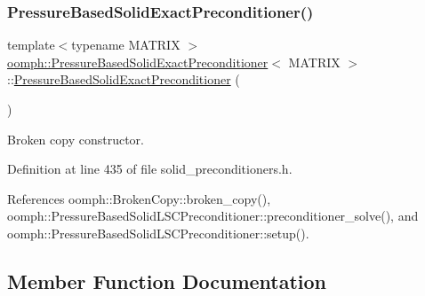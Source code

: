 \subsubsection{\texorpdfstring{Pressure\+Based\+Solid\+Exact\+Preconditioner()}{PressureBasedSolidExactPreconditioner()}\hspace{0.1cm}{\footnotesize\ttfamily [2/2]}}
{\footnotesize\ttfamily template$<$typename M\+A\+T\+R\+IX $>$ \\
\hyperlink{classoomph_1_1PressureBasedSolidExactPreconditioner}{oomph\+::\+Pressure\+Based\+Solid\+Exact\+Preconditioner}$<$ M\+A\+T\+R\+IX $>$\+::\hyperlink{classoomph_1_1PressureBasedSolidExactPreconditioner}{Pressure\+Based\+Solid\+Exact\+Preconditioner} (\begin{DoxyParamCaption}\item[{const \hyperlink{classoomph_1_1PressureBasedSolidExactPreconditioner}{Pressure\+Based\+Solid\+Exact\+Preconditioner}$<$ M\+A\+T\+R\+IX $>$ \&}]{ }\end{DoxyParamCaption})\hspace{0.3cm}{\ttfamily [inline]}}



Broken copy constructor. 



Definition at line 435 of file solid\+\_\+preconditioners.\+h.



References oomph\+::\+Broken\+Copy\+::broken\+\_\+copy(), oomph\+::\+Pressure\+Based\+Solid\+L\+S\+C\+Preconditioner\+::preconditioner\+\_\+solve(), and oomph\+::\+Pressure\+Based\+Solid\+L\+S\+C\+Preconditioner\+::setup().



\subsection{Member Function Documentation}
\mbox{\label{classoomph_1_1PressureBasedSolidExactPreconditioner_ae7fce5484d8c480111a3a0929adcfaf4}} 
